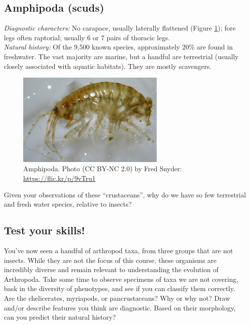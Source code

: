 \documentclass[letterpaper, 11pt]{article}
\begin{document}
\subsection{Amphipoda (scuds)}
\noindent{}\textit{Diagnostic characters:} No carapace, usually laterally flattened (Figure \ref{fig:amphip}); fore legs often raptorial; usually 6 or 7 pairs of thoracic legs.\\

\noindent{}\textit{Natural history:} Of the 9,500 known species, approximately 20\% are found in freshwater. The vast majority are marine, but a handful are terrestrial (usually closely associated with aquatic habitats). They are mostly scavengers.\\

\begin{figure}[ht!]
  \centering
    \includegraphics[width=0.65\textwidth]{amphip}
  \caption{Amphipoda. Photo (CC BY-NC 2.0) by Fred Snyder:  \url{https://flic.kr/p/9vTru1}}
  \label{fig:amphip}
\end{figure}

\noindent{}Given your observations of these ``crustaceans'', why do we have so few terrestrial and fresh water species, relative to insects? \\

\subsection{Test your skills!}
You've now seen a handful of arthropod taxa, from three groups that are not insects. While they are not the focus of this course, these organisms are incredibly diverse and remain relevant to understanding the evolution of Arthropoda. Take some time to observe specimens of taxa we are not covering, bask in the diversity of phenotypes, and see if you can classify them correctly. Are the chelicerates, myriapods, or pancrustaceans? Why or why not? Draw and/or describe features you think are diagnostic. Based on their morphology, can you predict their natural history?
\end{document}

